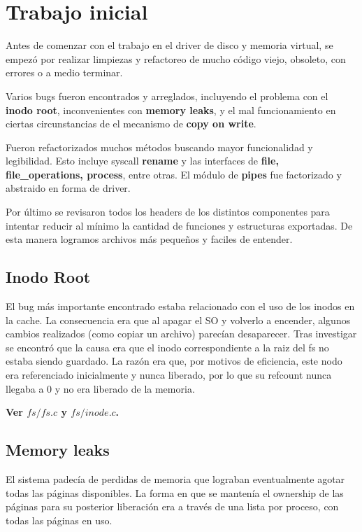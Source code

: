 \section{Trabajo inicial}

Antes de comenzar con el trabajo en el driver de disco y memoria virtual, se
empezó por realizar limpiezas y refactoreo de mucho código viejo, obsoleto, con
errores o a medio terminar.

Varios bugs fueron encontrados y arreglados, incluyendo el problema con el
\textbf{inodo root}, inconvenientes con \textbf{memory leaks}, y el mal
funcionamiento en ciertas circunstancias de el mecanismo de \textbf{copy on
write}.

Fueron refactorizados muchos métodos buscando mayor funcionalidad y legibilidad.
Esto incluye syscall \textbf{rename} y las interfaces de \textbf{file,
file\_operations, process}, entre otras. El módulo de \textbf{pipes} fue
factorizado y abstraido en forma de driver.

Por último se revisaron todos los headers de los distintos componentes para
intentar reducir al mínimo la cantidad de funciones y estructuras exportadas. De
esta manera logramos archivos más pequeños y faciles de entender.

\subsection{Inodo Root}

El bug más importante encontrado estaba relacionado con el uso de los inodos en
la cache. La consecuencia era que al apagar el SO y volverlo a encender, algunos
cambios realizados (como copiar un archivo) parecían desaparecer. Tras
investigar se encontró que la causa era que el inodo correspondiente a la raiz
del fs no estaba siendo guardado. La razón era que, por motivos de eficiencia,
este nodo era referenciado inicialmente y nunca liberado, por lo que su refcount
nunca llegaba a 0 y no era liberado de la memoria.

\textbf{Ver $fs/fs.c$ y $fs/inode.c$.}

\subsection{Memory leaks}

El sistema padecía de perdidas de memoria que lograban eventualmente agotar
todas las páginas disponibles. La forma en que se mantenía el ownership de las
páginas para su posterior liberación era a través de una lista por proceso, con
todas las páginas en uso.


